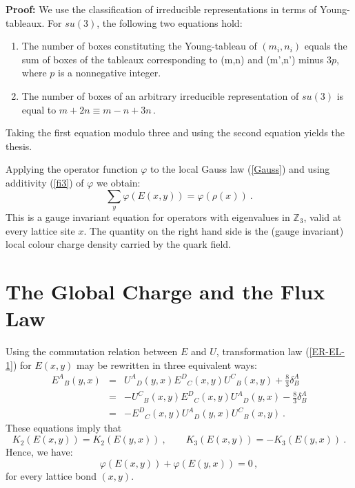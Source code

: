 \documentclass[a4paper,12pt]{article}
\begin{document}
{\bf Proof:} We use the classification of irreducible
representations in terms of Young-tableaux. For $su(3)$, the
following two equations hold:
\begin{enumerate}
\item
The number of boxes constituting the Young-tableau of $(m_i,n_i)$
equals the sum of boxes of the tableaux corresponding to (m,n) and
(m',n') minus $3p$, where $p$ is a nonnegative integer.
\item
The number of boxes of an arbitrary irreducible representation of
$su(3)$ is equal to $m + 2n \equiv m - n + 3n \,$.
\end{enumerate}
Taking the first equation modulo three and using the second
equation yields the thesis.

Applying the operator function $\varphi$ to the local Gauss law
(\ref{Gauss}) and using additivity (\ref{fi3}) of $\varphi$ we
obtain:
\begin{equation}
\label{inGauss} \sum_y \varphi(E(x,y)) = \varphi(\rho(x)) \ .
\end{equation}
This is a gauge invariant equation for operators with eigenvalues
in ${\mathbb Z}_3$, valid at every lattice site $x$. The quantity
on the right hand side is the (gauge invariant) local colour
charge density carried by the quark field.

\setcounter{equation}{0}
\section{The Global Charge and the Flux Law}
\label{Charge}

Using the commutation relation between $E$ and $U$, transformation
law (\ref{ER-EL-1}) for $E(x,y)$  may be rewritten in three
equivalent ways:
\begin{eqnarray}\label{ER-EL-2}
   {E^A}_B(y,x) & = &
   {U^A}_D(y,x) {E^D}_C(x,y) {U^C}_B(x,y) + \frac 83 \delta^A_B \\
   & = & -
   {U^C}_B(x,y) {E^D}_C(x,y) {U^A}_D(y,x) - \frac 83 \delta^A_B \\
   & = & -
   {E^D}_C(x,y)  {U^A}_D(y,x) {U^C}_B(x,y) \ .\label{ER-EL-4}
\end{eqnarray}
These equations imply that
\begin{equation}\label{K2-K3}
  K_2(E(x,y)) = K_2(E(y,x)) \ , \ \ \ \ \ \ \ \ \
  K_3(E(x,y)) = - K_3(E(y,x)) \ .
\end{equation}
Hence, we have:
\begin{equation}
\varphi(E(x,y)) + \varphi(E(y,x)) = 0  \, ,
\end{equation}
for every lattice bond $(x,y)$.
\end{document}
